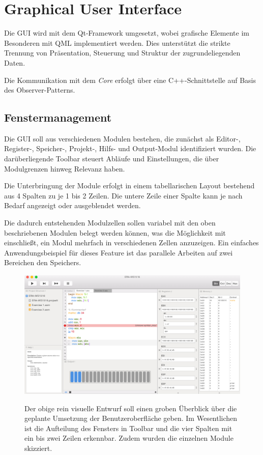     \section{Graphical User Interface}

        Die GUI wird mit dem Qt-Framework umgesetzt, wobei grafische Elemente im Besonderen mit QML implementiert werden. Dies unterstützt die strikte Trennung von Präsentation, Steuerung und Struktur der zugrundeliegenden Daten.

        Die Kommunikation mit dem \textit{Core} erfolgt über eine C++-Schnittstelle auf Basis des Observer-Patterns.


        \subsection{Fenstermanagement}

            Die GUI soll aus verschiedenen Modulen bestehen, die zunächst als Editor-, Register-, Speicher-, Projekt-, Hilfs- und Output-Modul identifiziert wurden. Die darüberliegende Toolbar steuert Abläufe und Einstellungen, die über Modulgrenzen hinweg Relevanz haben.

            Die Unterbringung der Module erfolgt in einem tabellarischen Layout bestehend aus 4 Spalten zu je 1 bis 2 Zeilen. Die untere Zeile einer Spalte kann je nach Bedarf angezeigt oder ausgeblendet werden.

            Die dadurch entstehenden Modulzellen sollen variabel mit den oben beschriebenen Modulen belegt werden können, was die Möglichkeit mit einschließt, ein Modul mehrfach in verschiedenen Zellen anzuzeigen. Ein einfaches Anwendungsbeispiel für dieses Feature ist das parallele Arbeiten auf zwei Bereichen den Speichers.

		    \begin{figure}
		    	\includegraphics[width=\textwidth]{../ui/figures/mockup}
		    	\label{fig:Mockup}
		    	\caption{Der obige rein visuelle Entwurf soll einen groben Überblick über die geplante Umsetzung der Benutzeroberfläche geben. Im Wesentlichen ist die Aufteilung des Fensters in Toolbar und die vier Spalten mit ein bis zwei Zeilen erkennbar. Zudem wurden die einzelnen Module skizziert.}
		    \end{figure}

